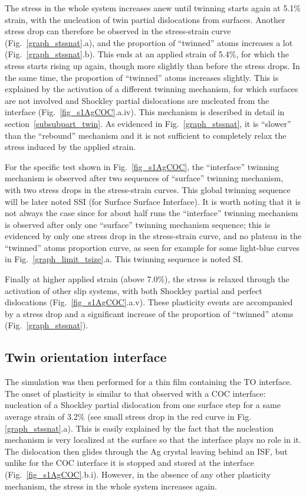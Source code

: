 \documentclass[final,3p,times,twocolumn]{elsarticle}
\begin{document}
The stress in the whole system increases anew until twinning starts again at 5.1\% strain, with the nucleation of twin partial dislocations from surfaces. Another stress drop can therefore be observed in the stress-strain curve (Fig.~\ref{graph_stssnat}.a), and the proportion of ``twinned'' atoms increases a lot (Fig.~\ref{graph_stssnat}.b). This ends at an applied strain of 5.4\%, for which the stress starts rising up again, though more slightly than before the stress drops. In the same time, the proportion of ``twinned'' atoms increases slightly. This is explained by the activation of a different twinning mechanism, for which surfaces are not involved and Shockley partial dislocations are nucleated from the interface (Fig.~\ref{fig_s1AgCOC}.a.iv). This mechanism is described in detail in section~\ref{subsubpart_twin}. As evidenced in Fig.~\ref{graph_stssnat}, it is ``slower'' than the ``rebound'' mechanism and it is not sufficient to completely relax the stress induced by the applied strain.

For the specific test shown in Fig.~\ref{fig_s1AgCOC}, the ``interface'' twinning mechanism is observed after two sequences of ``surface'' twinning mechanism, with two stress drops in the stress-strain curves. This global twinning sequence will be later noted SSI (for Surface Surface Interface). It is worth noting that it is not always the case since for about half runs the ``interface'' twinning mechanism is observed after only one ``surface'' twinning mechanism sequence; this is evidenced by only one stress drop in the stress-strain curve, and no plateau in the ``twinned'' atoms proportion curve, as seen for example for some light-blue curves in Fig.~\ref{graph_limit_tsize}.a. This twinning sequence is noted SI.

Finally at higher applied strain (above 7.0\%), the stress is relaxed through the activation of other slip systems, with both Shockley partial and perfect dislocations (Fig.~\ref{fig_s1AgCOC}.a.v). These plasticity events are  accompanied by a stress drop and a significant increase of the proportion of ``twinned'' atoms (Fig.~\ref{graph_stssnat}).

	\subsection{Twin orientation interface}\label{subsubpart_sAg2}
	
The simulation was then performed for a thin film containing the TO interface. The onset of plasticity is similar to that observed with a COC interface: nucleation of a Shockley partial dislocation from one surface step for a same average strain of 3.2\% (see small stress drop in the red curve in Fig.\ref{graph_stssnat}.a). This is easily explained by the fact that the nucleation mechanism is very localized at the surface so that the interface plays no role in it. The dislocation then glides through the Ag crystal leaving behind an ISF, but unlike for the COC interface it is stopped and stored at the interface (Fig.~\ref{fig_s1AgCOC}.b.i). However, in the absence of any other plasticity mechanism, the stress in the whole system increases again.
 
\end{document}
